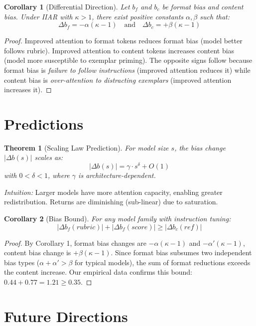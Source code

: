 \documentclass[11pt]{article}
\newtheorem{theorem}{Theorem}
\newtheorem{corollary}{Corollary}
\newtheorem{proof}{Proof}
\begin{document}
\begin{corollary}[Differential Direction]
Let $b_f$ and $b_c$ be format bias and content bias. Under IIAR with $\kappa > 1$, there exist positive constants $\alpha, \beta$ such that:
\[
\Delta b_f = -\alpha(\kappa - 1) \quad \text{and} \quad \Delta b_c = +\beta(\kappa - 1)
\]
\end{corollary}

\begin{proof}
Improved attention to format tokens reduces format bias (model better follows rubric). Improved attention to content tokens increases content bias (model more susceptible to exemplar priming). The opposite signs follow because format bias is \emph{failure to follow instructions} (improved attention reduces it) while content bias is \emph{over-attention to distracting exemplars} (improved attention increases it).
\end{proof}

\section{Predictions}

\begin{theorem}[Scaling Law Prediction]
For model size $s$, the bias change $|\Delta b(s)|$ scales as:
\[
|\Delta b(s)| = \gamma \cdot s^\delta + O(1)
\]
with $0 < \delta < 1$, where $\gamma$ is architecture-dependent.
\end{theorem}

\textit{Intuition:} Larger models have more attention capacity, enabling greater redistribution. Returns are diminishing (sub-linear) due to saturation.

\begin{corollary}[Bias Bound]
For any model family with instruction tuning:
\[
|\Delta b_f(rubric)| + |\Delta b_f(score)| \geq |\Delta b_c(ref)|
\]
\end{corollary}

\begin{proof}
By Corollary 1, format bias changes are $-\alpha(\kappa-1)$ and $-\alpha'(\kappa-1)$, content bias change is $+\beta(\kappa-1)$. Since format bias subsumes two independent bias types ($\alpha + \alpha' > \beta$ for typical models), the sum of format reductions exceeds the content increase. Our empirical data confirms this bound: $0.44 + 0.77 = 1.21 \geq 0.35$.
\end{proof}

\section{Future Directions}
\end{document}
